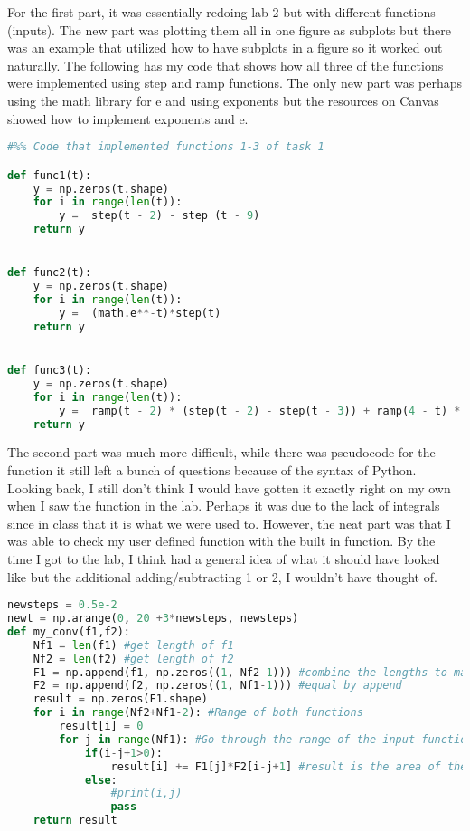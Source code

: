\documentclass[12pt]{report}
\begin{document}
For the first part, it was essentially redoing lab 2 but with different functions (inputs). The new part was plotting them all in one figure as subplots but there was an example that utilized how to have subplots in a figure so it worked out naturally. The following has my code that shows how all three of the functions were implemented using step and ramp functions. The only new part was perhaps using the math library for e and using exponents but the resources on Canvas showed how to implement exponents and e. 
\begin{lstlisting}[language=Python]
#%% Code that implemented functions 1-3 of task 1

def func1(t):
    y = np.zeros(t.shape)
    for i in range(len(t)):
        y =  step(t - 2) - step (t - 9) 
    return y


def func2(t):
    y = np.zeros(t.shape)
    for i in range(len(t)):
        y =  (math.e**-t)*step(t) 
    return y


def func3(t):
    y = np.zeros(t.shape)
    for i in range(len(t)):
        y =  ramp(t - 2) * (step(t - 2) - step(t - 3)) + ramp(4 - t) * (step(t - 3) - step(t - 4))
    return y
\end{lstlisting}

The second part was much more difficult, while there was pseudocode for the function it still left a bunch of questions because of the syntax of Python. Looking back, I still don't think I would have gotten it exactly right on my own when I saw the function in the lab. Perhaps it was due to the lack of integrals since in class that it is what we were used to. However, the neat part was that I was able to check my user defined function with the built in function. By the time I got to the lab, I think had a general idea of what it should have looked like but the additional adding/subtracting 1 or 2, I wouldn't have thought of. 

\begin{lstlisting}[language=Python]
newsteps = 0.5e-2
newt = np.arange(0, 20 +3*newsteps, newsteps)
def my_conv(f1,f2):
    Nf1 = len(f1) #get length of f1
    Nf2 = len(f2) #get length of f2
    F1 = np.append(f1, np.zeros((1, Nf2-1))) #combine the lengths to make them
    F2 = np.append(f2, np.zeros((1, Nf1-1))) #equal by append
    result = np.zeros(F1.shape)
    for i in range(Nf2+Nf1-2): #Range of both functions
        result[i] = 0
        for j in range(Nf1): #Go through the range of the input function
            if(i-j+1>0):
                result[i] += F1[j]*F2[i-j+1] #result is the area of the two
            else:
                #print(i,j)
                pass
    return result
\end{lstlisting}
\end{document}
